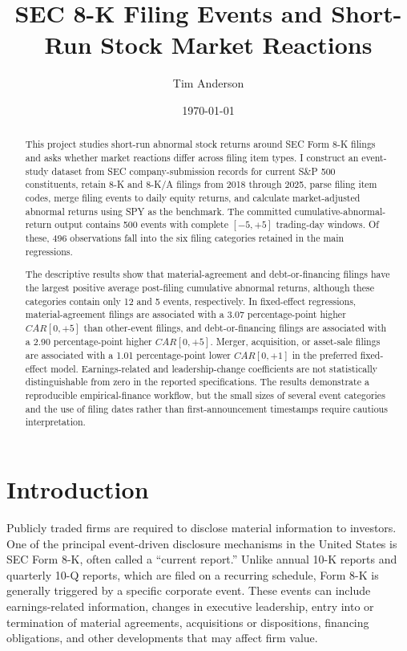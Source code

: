 \documentclass[12pt]{article}
\title{SEC 8-K Filing Events and Short-Run Stock Market Reactions}
\author{Tim Anderson}
\date{\today}
\begin{document}
\maketitle

\begin{abstract}
This project studies short-run abnormal stock returns around SEC Form 8-K filings and asks whether market reactions differ across filing item types. I construct an event-study dataset from SEC company-submission records for current S\&P 500 constituents, retain 8-K and 8-K/A filings from 2018 through 2025, parse filing item codes, merge filing events to daily equity returns, and calculate market-adjusted abnormal returns using SPY as the benchmark. The committed cumulative-abnormal-return output contains 500 events with complete $[-5,+5]$ trading-day windows. Of these, 496 observations fall into the six filing categories retained in the main regressions.

The descriptive results show that material-agreement and debt-or-financing filings have the largest positive average post-filing cumulative abnormal returns, although these categories contain only 12 and 5 events, respectively. In fixed-effect regressions, material-agreement filings are associated with a 3.07 percentage-point higher $CAR[0,+5]$ than other-event filings, and debt-or-financing filings are associated with a 2.90 percentage-point higher $CAR[0,+5]$. Merger, acquisition, or asset-sale filings are associated with a 1.01 percentage-point lower $CAR[0,+1]$ in the preferred fixed-effect model. Earnings-related and leadership-change coefficients are not statistically distinguishable from zero in the reported specifications. The results demonstrate a reproducible empirical-finance workflow, but the small sizes of several event categories and the use of filing dates rather than first-announcement timestamps require cautious interpretation.
\end{abstract}

\section{Introduction}

Publicly traded firms are required to disclose material information to investors. One of the principal event-driven disclosure mechanisms in the United States is SEC Form 8-K, often called a ``current report.'' Unlike annual 10-K reports and quarterly 10-Q reports, which are filed on a recurring schedule, Form 8-K is generally triggered by a specific corporate event. These events can include earnings-related information, changes in executive leadership, entry into or termination of material agreements, acquisitions or dispositions, financing obligations, and other developments that may affect firm value.
\end{document}
